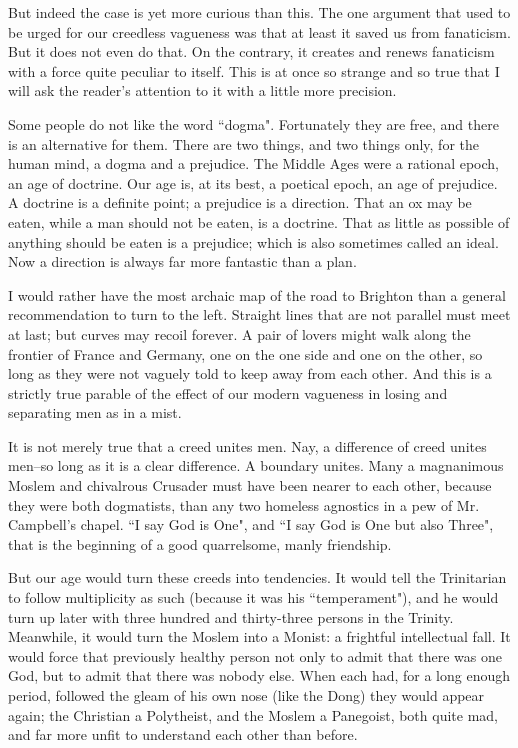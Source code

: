 \documentclass[final,10pt,letterpaper,twocolumn,openany]{book}
\begin{document}
But indeed the case is yet more curious than this. The one argument
that used to be urged for our creedless vagueness was that at least it saved
us from fanaticism. But it does not even do that. On the contrary, it creates
and renews fanaticism with a force quite peculiar to itself. This is at once
so strange and so true that I will ask the reader's attention to it with a little more precision.

Some people do not like the word ``dogma". Fortunately they are free,
and there is an alternative for them. There are two things, and two things
only, for the human mind, a dogma and a prejudice. The Middle Ages
were a rational epoch, an age of doctrine. Our age is, at its best, a poetical
epoch, an age of prejudice. A doctrine is a definite point; a prejudice is a
direction. That an ox may be eaten, while a man should not be eaten, is a
doctrine. That as little as possible of anything should be eaten is a
prejudice; which is also sometimes called an ideal. Now a direction is
always far more fantastic than a plan. 

I would rather have the most archaic
map of the road to Brighton than a general recommendation to turn to the
left. Straight lines that are not parallel must meet at last; but curves may
recoil forever. A pair of lovers might walk along the frontier of France and
Germany, one on the one side and one on the other, so long as they were
not vaguely told to keep away from each other. And this is a strictly true
parable of the effect of our modern vagueness in losing and separating
men as in a mist.

It is not merely true that a creed unites men. Nay, a difference of creed
unites men--so long as it is a clear difference. A boundary unites. Many a
magnanimous Moslem and chivalrous Crusader must have been nearer to
each other, because they were both dogmatists, than any two homeless
agnostics in a pew of Mr. Campbell's chapel. ``I say God is One", and ``I
say God is One but also Three", that is the beginning of a good
quarrelsome, manly friendship. 

But our age would turn these creeds into
tendencies. It would tell the Trinitarian to follow multiplicity as such
(because it was his ``temperament"), and he would turn up later with three
hundred and thirty-three persons in the Trinity. Meanwhile, it would turn
the Moslem into a Monist: a frightful intellectual fall. It would force that
previously healthy person not only to admit that there was one God, but to
admit that there was nobody else. When each had, for a long enough
period, followed the gleam of his own nose (like the Dong) they would
appear again; the Christian a Polytheist, and the Moslem a Panegoist, both
quite mad, and far more unfit to understand each other than before.
\end{document}
